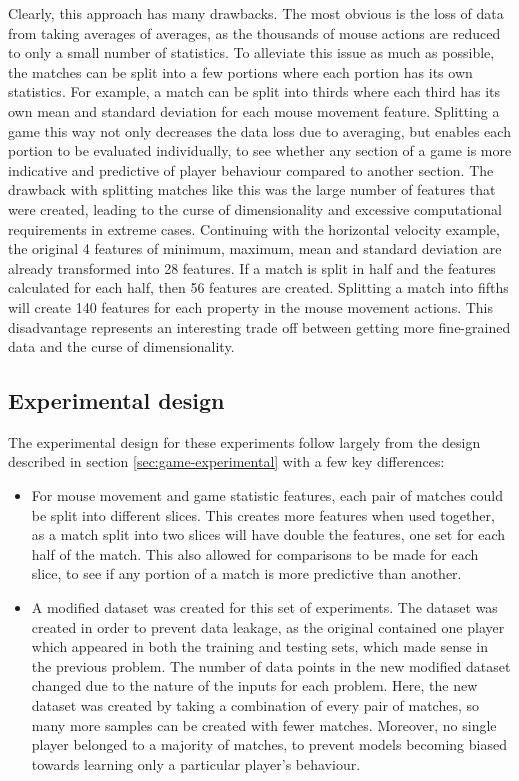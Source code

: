 \documentclass[Report.tex]{subfiles}
\begin{document}
Clearly, this approach has many drawbacks. The most obvious is the loss of data from taking averages of averages, as the thousands of mouse actions are reduced to only a small number of statistics. To alleviate this issue as much as possible, the matches can be split into a few portions where each portion has its own statistics. For example, a match can be split into thirds where each third has its own mean and standard deviation for each mouse movement feature. Splitting a game this way not only decreases the data loss due to averaging, but enables each portion to be evaluated individually, to see whether any section of a game is more indicative and predictive of player behaviour compared to another section. The drawback with splitting matches like this was the large number of features that were created, leading to the curse of dimensionality and excessive computational requirements in extreme cases. Continuing with the horizontal velocity example, the original 4 features of minimum, maximum, mean and standard deviation are already transformed into 28 features. If a match is split in half and the features calculated for each half, then 56 features are created. Splitting a match into fifths will create 140 features for each property in the mouse movement actions. This disadvantage represents an interesting trade off between getting more fine-grained data and the curse of dimensionality. 

\subsection{Experimental design}
The experimental design for these experiments follow largely from the design described in section \ref{sec:game-experimental} with a few key differences:
\begin{itemize}
\item For mouse movement and game statistic features, each pair of matches could be split into different slices. This creates more features when used together, as a match split into two slices will have double the features, one set for each half of the match. This also allowed for comparisons to be made for each slice, to see if any portion of a match is more predictive than another. 
\item A modified dataset was created for this set of experiments. The dataset was created in order to prevent data leakage, as the original contained one player which appeared in both the training and testing sets, which made sense in the previous problem. The number of data points in the new modified dataset changed due to the nature of the inputs for each problem. Here, the new dataset was created by taking a combination of every pair of matches, so many more samples can be created with fewer matches. Moreover, no single player belonged to a majority of matches, to prevent models becoming biased towards learning only a particular player's behaviour.

\end{itemize}
\end{document}
